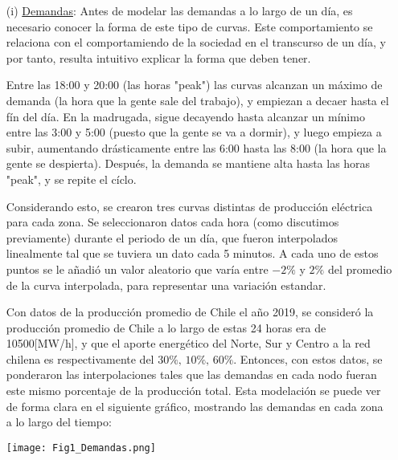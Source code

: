 \documentclass[12pt,twoside]{article}
\begin{document}
	\begin{itemize}
		\item [(i)] \underline{Demandas}: Antes de modelar las demandas a lo largo de un d\'ia, es necesario conocer la forma de este tipo de curvas. Este comportamiento se relaciona con el comportamiendo de la sociedad en el transcurso de un d\'ia, y por tanto, resulta intuitivo explicar la forma que deben tener.
		
		 \hspace{1cm} Entre las 18:00 y 20:00 (las horas "peak") las curvas alcanzan un m\'aximo de demanda (la hora que la gente sale del trabajo), y empiezan a decaer hasta el f\'in del d\'ia. En la madrugada, sigue decayendo hasta alcanzar un m\'inimo entre las 3:00 y 5:00 (puesto que la gente se va a dormir), y luego empieza a subir, aumentando dr\'asticamente entre las 6:00 hasta las 8:00 (la hora que la gente se despierta). Despu\'es, la demanda se mantiene alta hasta las horas "peak", y se repite el c\'iclo.
		
		 \hspace{1cm} Considerando esto, se crearon tres curvas distintas de producci\'on el\'ectrica para cada zona. Se seleccionaron datos cada hora (como discutimos previamente) durante el periodo de un d\'ia, que fueron interpolados linealmente tal que se tuviera un dato cada 5 minutos. A cada uno de estos puntos se le a\~{n}adi\'o un valor aleatorio que var\'ia entre \(-2\%\) y \(2\%\) del promedio de la curva interpolada, para representar una variaci\'on estandar.
		
		\hspace{1cm} Con datos de la producci\'on promedio de Chile el a\~{n}o 2019, se consider\'o la producci\'on promedio de Chile a lo largo de estas 24 horas era de 10500[MW/h], y que el aporte energ\'etico del Norte, Sur y Centro a la red chilena es respectivamente del \(30\%,\,10\%,\,60\%\). Entonces, con estos datos, se ponderaron las interpolaciones tales que las demandas en cada nodo fueran este mismo porcentaje de la producci\'on total. Esta modelaci\'on se puede ver de forma clara en el siguiente gr\'afico, mostrando las demandas en cada zona a lo largo del tiempo:
		
		\begin{center}
			\texttt{[image: Fig1\_Demandas.png]}
		\end{center}
		

\end{itemize}
\end{document}
